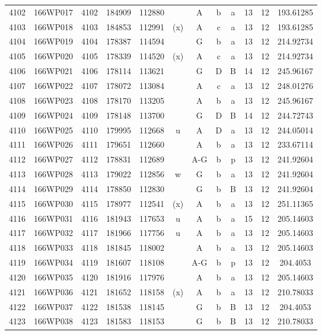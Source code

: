 \begin{tabular}{|*{12}{c|}}
4102 & 166WP017 & 4102 & 184909 & 112880 &  & A & b & a & 13 & 12 & 193.61285 \\ 
4103 & 166WP018 & 4103 & 184853 & 112991 & (x) & A & c & a & 13 & 12 & 193.61285 \\ 
4104 & 166WP019 & 4104 & 178387 & 114594 &  & G & b & a & 13 & 12 & 214.92734 \\ 
4105 & 166WP020 & 4105 & 178339 & 114520 & (x) & A & c & a & 13 & 12 & 214.92734 \\ 
4106 & 166WP021 & 4106 & 178114 & 113621 &  & G & D & B & 14 & 12 & 245.96167 \\ 
4107 & 166WP022 & 4107 & 178072 & 113084 &  & A & c & a & 13 & 12 & 248.01276 \\ 
4108 & 166WP023 & 4108 & 178170 & 113205 &  & A & b & a & 13 & 12 & 245.96167 \\ 
4109 & 166WP024 & 4109 & 178148 & 113700 &  & G & D & B & 14 & 12 & 244.72743 \\ 
4110 & 166WP025 & 4110 & 179995 & 112668 & u & A & D & a & 13 & 12 & 244.05014 \\ 
4111 & 166WP026 & 4111 & 179651 & 112660 &  & A & b & a & 13 & 12 & 233.67114 \\ 
4112 & 166WP027 & 4112 & 178831 & 112689 &  & A-G & b & p & 13 & 12 & 241.92604 \\ 
4113 & 166WP028 & 4113 & 179022 & 112856 & w & G & b & a & 13 & 12 & 241.92604 \\ 
4114 & 166WP029 & 4114 & 178850 & 112830 &  & G & b & B & 13 & 12 & 241.92604 \\ 
4115 & 166WP030 & 4115 & 178977 & 112541 & (x) & A & b & a & 13 & 12 & 251.11365 \\ 
4116 & 166WP031 & 4116 & 181943 & 117653 & u & A & b & a & 15 & 12 & 205.14603 \\ 
4117 & 166WP032 & 4117 & 181966 & 117756 & u & A & b & a & 13 & 12 & 205.14603 \\ 
4118 & 166WP033 & 4118 & 181845 & 118002 &  & A & b & a & 13 & 12 & 205.14603 \\ 
4119 & 166WP034 & 4119 & 181607 & 118108 &  & A-G & b & p & 13 & 12 & 204.4053 \\ 
4120 & 166WP035 & 4120 & 181916 & 117976 &  & A & b & a & 13 & 12 & 205.14603 \\ 
4121 & 166WP036 & 4121 & 181652 & 118158 & (x) & A & b & a & 13 & 12 & 210.78033 \\ 
4122 & 166WP037 & 4122 & 181538 & 118145 &  & G & b & B & 13 & 12 & 204.4053 \\ 
4123 & 166WP038 & 4123 & 181583 & 118153 &  & G & b & B & 13 & 12 & 210.78033 \\ 

\end{tabular}
